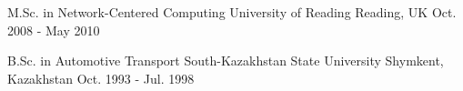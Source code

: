 
\begin{cventries}

  \cventry
  {M.Sc. in Network-Centered Computing} %
  {University of Reading} %
  {Reading, UK} %
  {Oct. 2008 - May 2010} %
  {}

  \cventry
  {B.Sc. in Automotive Transport} %
  {South-Kazakhstan State University} %
  {Shymkent, Kazakhstan} %
  {Oct. 1993 - Jul. 1998} %
  {}

\end{cventries}
